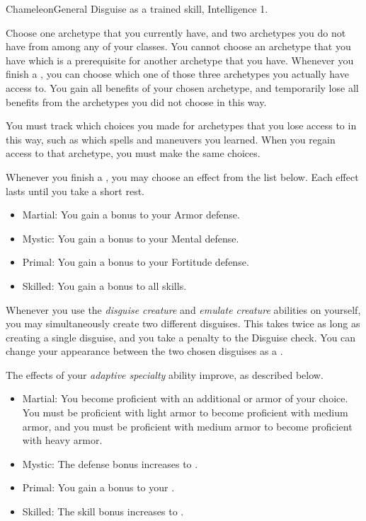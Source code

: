     \begin{feat}{Chameleon}{General}
        \featpre Disguise as a trained skill, Intelligence 1.

         Choose one archetype that you currently have, and two archetypes you do not have from among any of your classes.
        You cannot choose an archetype that you have which is a prerequisite for another archetype that you have.
        Whenever you finish a , you can choose which one of those three archetypes you actually have access to.
        You gain all benefits of your chosen archetype, and temporarily lose all benefits from the archetypes you did not choose in this way.

        You must track which choices you made for archetypes that you lose access to in this way, such as which spells and maneuvers you learned.
        When you regain access to that archetype, you must make the same choices.

         Whenever you finish a , you may choose an effect from the list below.
        Each effect lasts until you take a short rest.
        \begin{itemize}
            \item Martial: You gain a  bonus to your Armor defense.
            \item Mystic: You gain a  bonus to your Mental defense.
            \item Primal: You gain a  bonus to your Fortitude defense.
            \item Skilled: You gain a  bonus to all skills.
        \end{itemize}

         Whenever you use the \textit{disguise creature} and \textit{emulate creature} abilities on yourself, you may simultaneously create two different disguises.
        This takes twice as long as creating a single disguise, and you take a  penalty to the Disguise check.
        You can change your appearance between the two chosen disguises as a .

         The effects of your \textit{adaptive specialty} ability improve, as described below.
        \begin{itemize}
            \item Martial: You become proficient with an additional  or armor  of your choice.
                You must be proficient with light armor to become proficient with medium armor, and you must be proficient with medium armor to become proficient with heavy armor.
            \item Mystic: The defense bonus increases to .
            \item Primal: You gain a  bonus to your .
            \item Skilled: The skill bonus increases to .
        \end{itemize}


\end{feat}
